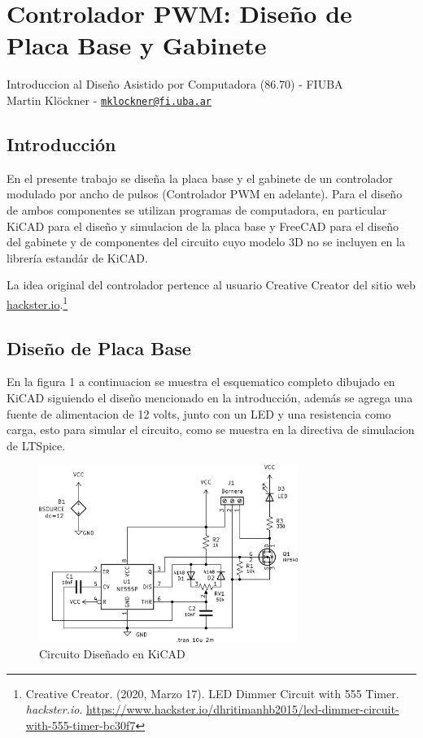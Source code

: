 \documentclass[
]{article}
\author{}
\date{}
\begin{document}
\hypertarget{controlador-pwm-diseuxf1o-de-placa-base-y-gabinete}{%
\section{Controlador PWM: Diseño de Placa Base y
Gabinete}\label{controlador-pwm-diseuxf1o-de-placa-base-y-gabinete}}

Introduccion al Diseño Asistido por Computadora (86.70) - FIUBA\\
Martin Klöckner -
\href{mailto:mklockner@fi.uba.ar}{\nolinkurl{mklockner@fi.uba.ar}}

\hypertarget{introducciuxf3n}{%
\subsection{Introducción}\label{introducciuxf3n}}

En el presente trabajo se diseña la placa base y el gabinete de un
controlador modulado por ancho de pulsos (Controlador PWM en adelante).
Para el diseño de ambos componentes se utilizan programas de
computadora, en particular KiCAD para el diseño y simulacion de la placa
base y FreeCAD para el diseño del gabinete y de componentes del circuito
cuyo modelo 3D no se incluyen en la librería estandár de KiCAD.

La idea original del controlador pertence al usuario Creative Creator
del sitio web \url{hackster.io}.\footnote{Creative Creator. (2020, Marzo
  17). LED Dimmer Circuit with 555 Timer. \emph{hackster.io}.
  \url{https://www.hackster.io/dhritimanhb2015/led-dimmer-circuit-with-555-timer-bc30f7}}

\hypertarget{diseuxf1o-de-placa-base}{%
\subsection{Diseño de Placa Base}\label{diseuxf1o-de-placa-base}}

En la figura 1 a continuacion se muestra el esquematico completo
dibujado en KiCAD siguiendo el diseño mencionado en la introducción,
además se agrega una fuente de alimentacion de 12 volts, junto con un
LED y una resistencia como carga, esto para simular el circuito, como se
muestra en la directiva de simulacion de LTSpice.

\begin{figure}
\centering
\includegraphics[width=0.75\textwidth,height=\textheight]{./esquematico.png}
\caption{Circuito Diseñado en KiCAD}
\end{figure}
\end{document}
